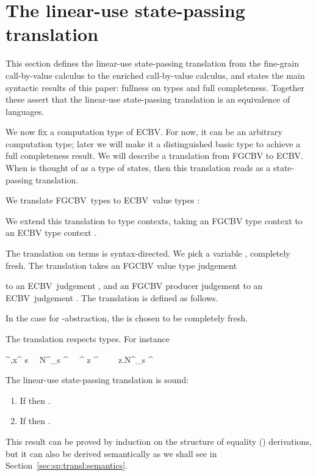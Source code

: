 \documentclass{LMCS}
\newcommand{\STA}{\sigma}
\newcommand{\STB}{\tau}
\newcommand{\EECarbstate}{\comptype{\mathsf{S}}}
\newcommand{\svar}s
\newcommand{\comptype}[1]{\underline{#1}}
\newcommand{\co}{\colon}
\newcommand{\tensor}{\otimes}
\newcommand{\ltensortype}[2]{{!} #1 \, {\tensor} \, #2}
\newcommand{\ltensorterm}[2]{{!  #1} \tensor #2}
\newcommand{\letdot}[4]{{#3}\:\mathrm{to}\:{(\ltensorterm{#1}{#2})}.\;#4}
\newcommand{\rIn}[2]{#1 \colon  #2}
\newcommand{\aj}[4]{#1 \mid  \! #2 \, \vdash \, \rIn{#3}{#4}}
\newcommand{\FGCBV}{FGCBV}
\newcommand{\ECBV}{ECBV}
\newcommand{\CBVtoEEC}[1]{#1^{\circ}}
\newcommand{\CBVtoEECbase}[2]{#2^{#1}}
\begin{document}
\section{The linear-use state-passing translation}
\label{sec:translation}

This section defines the linear-use state-passing translation
from the fine-grain call-by-value calculus to 
the enriched call-by-value calculus, 
and states the main syntactic results of this paper:
fullness on types and full completeness. Together these assert that 
the linear-use state-passing translation is an equivalence of languages.

We now fix a computation type  of \ECBV.
For now, it can be an arbitrary computation type; later
we will make it a distinguished basic type to achieve a 
full completeness result.
We will describe a translation 
from {\FGCBV} to {\ECBV}. 
When  is thought of as a type of states,
then this translation reads as a state-passing translation.

\renewcommand{\CBVtoEEC}{\CBVtoEECbase\EECarbstate}
\newcommand{\CBVtoEECV}{\CBVtoEECbase \EECarbstate}
\newcommand{\CBVtoEECP}[1]{\CBVtoEECbase \EECarbstate{#1}_\svar}
We translate \FGCBV\ types  to \ECBV\ value types
:

We extend this translation to type contexts,
taking an FGCBV type context  to an
ECBV type context .

The translation on terms is syntax-directed.
We pick a variable , completely fresh.
The translation takes an FGCBV value type judgement
  
to an \ECBV\
judgement ,
and an FGCBV producer judgement  
to an \ECBV\ judgement . The translation is defined as follows.

In the case for -abstraction, the  is chosen to be completely fresh.

The translation respects types. For instance


\quad
{\aj{\CBVtoEEC\Gamma,x\co \CBVtoEEC \STA}{s\co \EECarbstate}
{\CBVtoEECP N}{\ltensortype {\CBVtoEEC\STB}\EECarbstate}}
\justifies
{\aj{\CBVtoEEC\Gamma}{z\co \ltensortype {\CBVtoEEC\STA}\EECarbstate}
{\letdot x s z{\CBVtoEECP N}}{\ltensortype {\CBVtoEEC\STB}\EECarbstate}}



\begin{thm}The linear-use state-passing translation is sound: \label{thm:soundness}
\begin{enumerate}
\item
If  then 
.
\item 
If  then 
.
\end{enumerate}
\end{thm}
This result can be proved by induction on the structure of equality
() derivations, but it can also be derived semantically as 
we shall see in Section~\ref{sec:sp:transl:semantics}.
\end{document}

